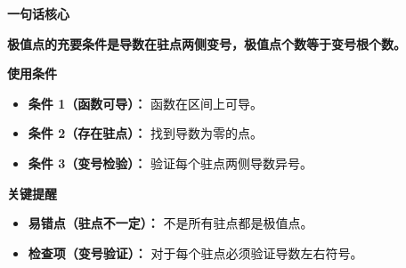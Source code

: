 \begin{summarybox}
	\textbf{\textcolor{CSummary}{一句话核心}}

	\textbf{极值点的充要条件是导数在驻点两侧变号，极值点个数等于变号根个数。}

	\medskip
	\textbf{\textcolor{CSummary}{使用条件}}
	\begin{itemize}[leftmargin=*, itemsep=0.5em, topsep=0.4em]
		\item \textbf{条件 1（函数可导）：} 函数在区间上可导。
		\item \textbf{条件 2（存在驻点）：} 找到导数为零的点。
		\item \textbf{条件 3（变号检验）：} 验证每个驻点两侧导数异号。
	\end{itemize}

	\medskip
	\textbf{\textcolor{CSummary}{关键提醒}}
	\begin{itemize}[leftmargin=*, itemsep=0.5em, topsep=0.4em]
		\item \textbf{易错点（驻点不一定）：} 不是所有驻点都是极值点。
		\item \textbf{检查项（变号验证）：} 对于每个驻点必须验证导数左右符号。
	\end{itemize}
\end{summarybox}
